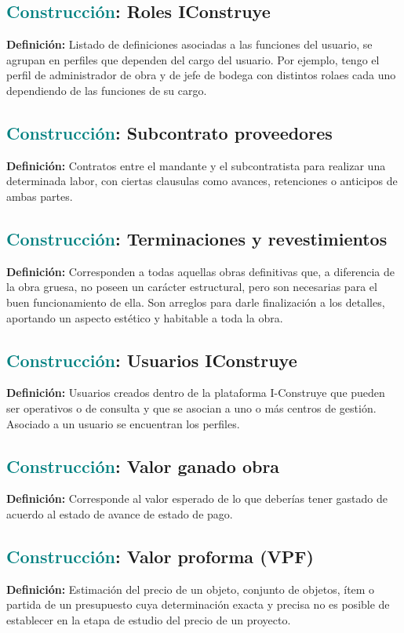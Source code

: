 \documentclass[12pt]{article}
\begin{document}
\subsection{\textcolor{teal}{Construcción}: Roles IConstruye}
\textbf{Definición:} Listado de definiciones asociadas a las funciones del usuario, se agrupan en perfiles que dependen del cargo del usuario. Por ejemplo, tengo el perfil de administrador de obra y de jefe de bodega con distintos rolaes cada uno dependiendo de las funciones de su cargo.
\subsection{\textcolor{teal}{Construcción}: Subcontrato proveedores}
\textbf{Definición:} Contratos entre el mandante y el subcontratista para realizar una determinada labor, con ciertas clausulas como avances, retenciones o anticipos de ambas partes.
\subsection{\textcolor{teal}{Construcción}: Terminaciones y revestimientos}
\textbf{Definición:} Corresponden a todas aquellas obras definitivas que, a diferencia de la obra gruesa, no poseen un carácter estructural, pero son necesarias para el buen funcionamiento de ella. Son arreglos para darle finalización a los detalles, aportando un aspecto estético y habitable a toda la obra.
\subsection{\textcolor{teal}{Construcción}: Usuarios IConstruye}
\textbf{Definición:} Usuarios creados dentro de la plataforma I-Construye que pueden ser operativos o de consulta y que se asocian a uno o más centros de gestión. Asociado a un usuario se encuentran los perfiles.
\subsection{\textcolor{teal}{Construcción}: Valor ganado obra}
\textbf{Definición:} Corresponde al valor esperado de lo que deberías tener gastado de acuerdo al estado de avance de estado de pago.
\subsection{\textcolor{teal}{Construcción}: Valor proforma (VPF)}
\textbf{Definición:} Estimación del precio de un objeto, conjunto de objetos, ítem o partida de un presupuesto cuya determinación exacta y precisa no es posible de establecer en la etapa de estudio del precio de un proyecto.
\end{document}
